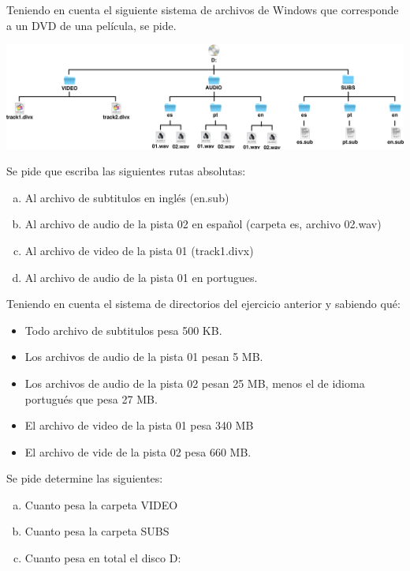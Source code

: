 \begin{exercise}
Teniendo en cuenta el siguiente sistema de archivos de Windows que
corresponde a un DVD de una película, se pide.

\centerline{\includegraphics[scale=0.4]{capitulos/informatica/imagenes/directorios_windows_4.png}}

Se pide que escriba las siguientes rutas absolutas:
\begin{enumerate}[a)]
    \item Al archivo de subtitulos en inglés (en.sub)
    \item Al archivo de audio de la pista 02 en español (carpeta es, archivo 02.wav)
    \item Al archivo de video de la pista 01 (track1.divx)
    \item Al archivo de audio de la pista 01 en portugues.
\end{enumerate}
\end{exercise}

\begin{exercise}
Teniendo en cuenta el sistema de directorios del ejercicio anterior y
sabiendo qué:
\begin{itemize}
    \item Todo archivo de subtitulos pesa 500 KB.
    \item Los archivos de audio de la pista 01 pesan 5 MB.
    \item Los archivos de audio de la pista 02 pesan 25 MB, menos el de idioma
        portugués que pesa 27 MB.
    \item El archivo de video de la pista 01 pesa 340 MB
    \item El archivo de vide de la pista 02 pesa 660 MB.
\end{itemize}

Se pide determine las siguientes:
\begin{enumerate}[a)]
    \item Cuanto pesa la carpeta VIDEO
    \item Cuanto pesa la carpeta SUBS
    \item Cuanto pesa en total el disco D:
\end{enumerate}
\end{exercise}

